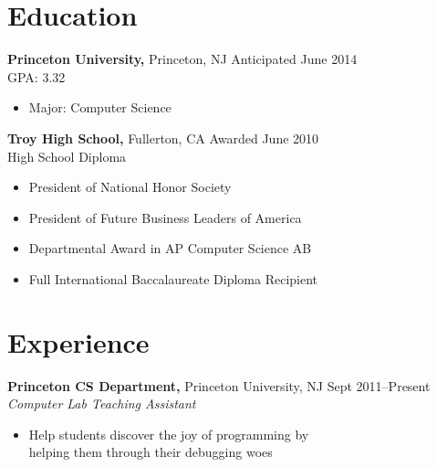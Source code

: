 \documentclass[margin]{res}
\begin{document}
 
 

\address{{\bf Present Address} \\ 3169 Frist Center \\ Princeton, NJ
  08544 \\ (714) 869-7503 \\ dan@dskang.com }

\address{{\bf Permanent Address} \\ 2507 Cypress Point Drive \\
  Fullerton, CA 92833 }

 
\begin{resume} 
 
\section{Education} 
 {\bf Princeton University,} Princeton, NJ \hfill Anticipated June
 2014 \\ GPA: 3.32
 \begin{itemize} \itemsep -2pt %
 \item Major: Computer Science
 \end{itemize}

 {\bf Troy High School,} Fullerton, CA \hfill Awarded June 2010 \\
 High School Diploma
 \begin{itemize} \itemsep -2pt %
 \item President of National Honor Society
 \item President of Future Business Leaders of America
 \item Departmental Award in AP Computer Science AB
 \item Full International Baccalaureate Diploma Recipient
 \end{itemize}



\section{Experience}
 {\bf Princeton CS Department,} Princeton University, NJ \hfill Sept 2011--Present \\
 {\it Computer Lab Teaching Assistant}
 \begin{itemize} \itemsep -2pt  %
 \item Help students discover the joy of programming by \\
   helping them through their debugging woes
 \end{itemize}


\end{resume}
\end{document}
